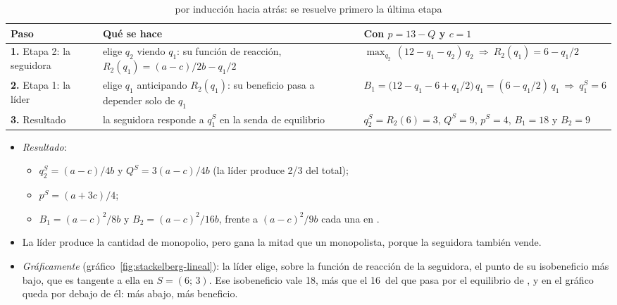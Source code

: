 \documentclass[11pt]{article}
\begin{document}
\begin{table}[H]
\centering
\caption{ por inducción hacia atrás: se resuelve primero la última etapa}\label{tab:stackelberg-pasos}
\begin{tabular}{>{\raggedright\arraybackslash}m{2.4cm}>{\raggedright\arraybackslash}m{5.2cm}>{\raggedright\arraybackslash}m{7.2cm}}
\toprule
\rowcolor{tceeazulpalido}\textbf{Paso} & \textbf{Qué se hace} & \textbf{Con $p=13-Q$ y $c=1$}\\
\midrule
\textcolor{tceemorado}{\textbf{1.}} Etapa 2: la seguidora & elige $q_2$ viendo $q_1$: su función de reacción, $R_2(q_1)=(a-c)/2b-q_1/2$ & $\max_{q_2}\,(12-q_1-q_2)\,q_2\ \Rightarrow\ R_2(q_1)=6-q_1/2$\\
\addlinespace[0.3em]
\textcolor{tceemorado}{\textbf{2.}} Etapa 1: la líder & elige $q_1$ anticipando $R_2(q_1)$: su beneficio pasa a depender solo de $q_1$ & $B_1=\big(12-q_1-6+q_1/2\big)\,q_1=(6-q_1/2)\,q_1\ \Rightarrow\ q_1^S=6$\\
\addlinespace[0.3em]
\textcolor{tceemorado}{\textbf{3.}} Resultado & la seguidora responde a $q_1^S$ en la senda de equilibrio & $q_2^S=R_2(6)=3$, $Q^S=9$, $p^S=4$, $B_1=18$ y $B_2=9$\\
\bottomrule
\end{tabular}
\end{table}

\begin{itemize}
\item \emph{Resultado}:
  \begin{itemize}
  \item $q_2^S=(a-c)/4b$ y $Q^S=3(a-c)/4b$ (la líder produce 2/3 del total);
  \item $p^S=(a+3c)/4$;
  \item $B_1=(a-c)^2/8b$ y $B_2=(a-c)^2/16b$, frente a $(a-c)^2/9b$ cada una en .
  \end{itemize}
\item La líder produce la cantidad de monopolio, pero gana la mitad que un monopolista, porque la seguidora también vende.
\item \emph{Gráficamente} (gráfico~\ref{fig:stackelberg-lineal}): la líder elige, sobre la función de reacción de la seguidora, el punto de su isobeneficio más bajo, que es tangente a ella en $S=(6;\,3)$. Ese isobeneficio vale 18, más que el 16~del que pasa por el equilibrio de , y en el gráfico queda por debajo de él: más abajo, más beneficio.
\end{itemize}
\end{document}

